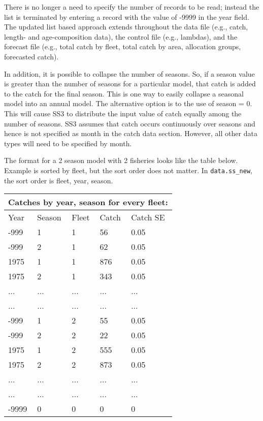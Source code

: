 \hypertarget{ListBased}{}
There is no longer a need to specify the number of records to be read; instead the list is terminated by entering a record with the value of -9999 in the year field. The updated list based approach extends throughout the data file (e.g., catch, length- and age-composition data), the control file (e.g., lambdas), and the forecast file (e.g., total catch by fleet, total catch by area, allocation groups, forecasted catch).

In addition, it is possible to collapse the number of seasons. So, if a season value is greater than the number of seasons for a particular model, that catch is added to the catch for the final season. This is one way to easily collapse a seasonal model into an annual model. The alternative option is to the use of season = 0. This will cause SS3 to distribute the input value of catch equally among the number of seasons. SS3 assumes that catch occurs continuously over seasons and hence is not specified as month in the catch data section. However, all other data types will need to be specified by month.

The format for a 2 season model with 2 fisheries looks like the table below. Example is sorted by fleet, but the sort order does not matter. In \texttt{data.ss\_new}, the sort order is fleet, year, season.

\begin{center}
	\begin{tabular}{p{3cm} p{3cm} p{2cm} p{3cm} p{3cm}}
		\multicolumn{5}{l}{Catches by year, season for every fleet:} \\
		\hline
		Year & Season & Fleet & Catch & Catch SE \Tstrut\Bstrut\\
		\hline
		-999 & 1 & 1 & 56  & 0.05 \Tstrut\\
		-999 & 2 & 1 & 62  & 0.05 \\
		1975 & 1 & 1 & 876 & 0.05 \\
		1975 & 2 & 1 & 343 & 0.05 \\
		 ... & ... & ... & ... & ... \\
		 ... & ... & ... & ... & ... \\
		-999 & 1 & 2 & 55  & 0.05 \\
		-999 & 2 & 2 & 22  & 0.05 \\
		1975 & 1 & 2 & 555 & 0.05 \\
		1975 & 2 & 2 & 873 & 0.05 \\
		 ... & ... & ... & ... & ... \\
		 ... & ... & ... & ... & ... \\
		-9999 & 0 & 0 & 0 & 0 \Bstrut\\
		\hline
	\end{tabular}
	\leavevmode\tagmcend\tagstructend\par
\end{center}

